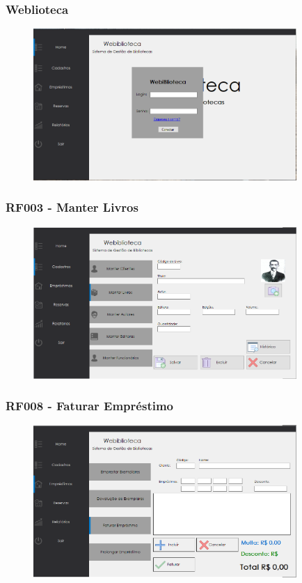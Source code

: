 \documentclass{beamer}
\begin{document}
\begin{frame}

\frametitle{Weblioteca}
\begin{figure}[!ht]
\centering
\includegraphics[width=10cm]{codigo/home.png}

\end{figure}

\end{frame}
\begin{frame}
\frametitle{RF003 - Manter Livros}
\begin{figure}[!ht]
\centering
\includegraphics[width=10cm]{codigo/img1.png}
\end{figure}

\end{frame}
\begin{frame}

\frametitle{RF008 - Faturar Empréstimo}
\begin{figure}[!ht]
\centering
\includegraphics[width=10cm]{codigo/img2.png}
\end{figure}

\end{frame}
\end{document}
